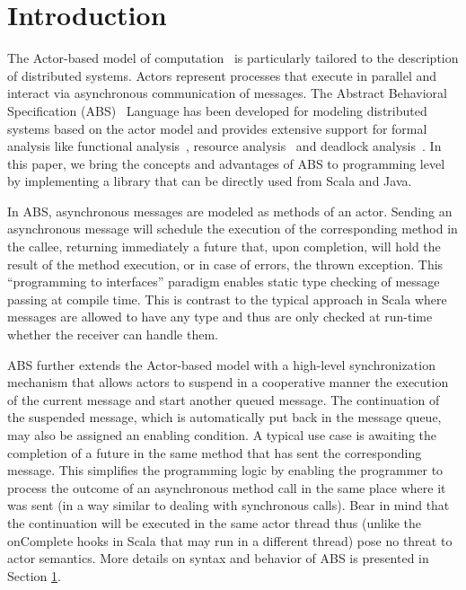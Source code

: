 \section{Introduction}



The Actor-based model of computation~\cite{Agha} is particularly tailored to the description of distributed systems. 
Actors represent processes that execute in parallel and interact via asynchronous communication of messages. 
The Abstract Behavioral Specification (ABS)~\cite{abs} Language has been developed for modeling distributed systems based on the actor model and provides extensive support for formal analysis like functional analysis~\cite{KeY}, resource analysis~\cite{saco} and deadlock analysis~\cite{dead}.
In this paper, we bring the concepts and advantages of ABS to programming level by implementing a library that can be directly used from Scala and Java.



In ABS, asynchronous messages are modeled as methods of an actor.
Sending an asynchronous message will schedule the execution of the corresponding method in the callee, returning immediately a future that, upon completion, will hold the result of the method execution, or in case of errors, the thrown exception.
This ``programming to interfaces'' paradigm enables static type checking of message passing at compile time.
This is contrast to the typical approach in Scala where messages are allowed to have any type and thus are only checked at run-time whether the receiver can handle them.

ABS further extends the Actor-based model with a high-level synchronization mechanism that allows actors to suspend in a cooperative manner the execution of the current message and start another queued message. 
The continuation of the suspended message, which is automatically put back in the message queue, may also be assigned an enabling condition. 
A typical use case is awaiting the completion of a future in the same method that has sent the corresponding message.
This simplifies the programming logic by enabling the programmer to process the outcome of an asynchronous method call in the same place where it was sent (in a way similar to dealing with synchronous calls).
Bear in mind that the continuation will be executed in the same actor thread thus (unlike the {\ttfamily onComplete} hooks in Scala that may run in a different thread) pose no threat to actor semantics.
More details on syntax and behavior of ABS is presented in Section \ref{}. %

